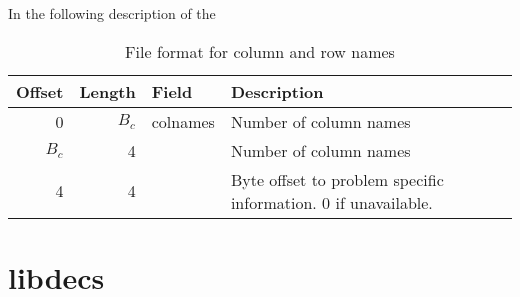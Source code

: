 In the following description of the 


\begin{table}[htbp]
	\centering
	\begin{tabular}{|r|r|l|p{2.7in}|}
		\hline
		\bf Offset & \bf Length & \bf Field & \bf Description \\ \hline
		0     & $B_c$ & colnames & Number of column names \\ \hline
		$B_c$ & 4     &  & Number of column names \\ \hline
		4     & 4     &   & Byte offset to problem specific information. 0 if unavailable. \\ \hline
	\end{tabular}
	\caption{File format for column and row names}
	\label{tab:colrowformat}
\end{table}





\section{libdecs}





